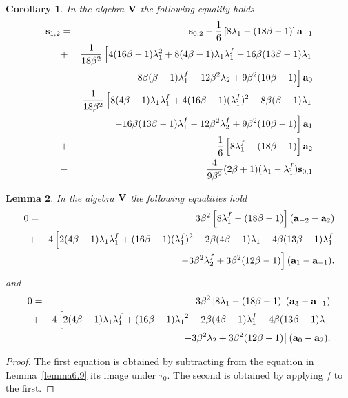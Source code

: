 \documentclass[a4paper]{amsart}
\newtheorem{lemma}{Lemma}[section]
\newtheorem{cor}[lemma]{Corollary}
\newcommand{\Vo}{{\bf V}}
\newcommand{\lmu}{\lambda_1}
\newcommand{\lmf}{\lambda_1^f}
\newcommand{\lmd}{\lambda_2}
\newcommand{\lmdf}{\lambda_2^f}
\newcommand{\bt}{\beta}
\newcommand{\ba}{{\bf a}}
\newcommand{\bs}{{\bf s}}
\begin{document}
\begin{cor}\label{eqs2f} %
In the algebra $\Vo$ the following equality holds
\begin{eqnarray*}
\bs_{1,2}&=&\bs_{0,2}-\frac{1}{6}\left[8\lmu-(18\bt-1)\right ]\ba_{-1}\\
&+&\frac{1}{18\bt^2}\left[4(16\bt-1)\lmu^2+8(4\bt-1)\lmu\lmf-16\bt(13\bt-1)\lmu \right . \nonumber \\
&& \left .-8\bt(\bt-1)\lmf-12\bt^2\lmd+9\bt^2(10\bt-1)\right ]\ba_0\nonumber \\
&-& \frac{1}{18\bt^2}\left [8(4\bt-1)\lmu\lmf+4(16\bt-1)(\lmf)^2-8\bt(\bt-1)\lmu \right . \nonumber \\
&& \left .-16\bt(13\bt-1)\lmf-12\bt^2\lmdf+9\bt^2(10\bt-1)\right ]\ba_1 \nonumber \\
&+&\frac{1}{6}\left [8\lmf-(18\bt-1)\right ]\ba_2 \nonumber \\
&-&\frac{4}{9\bt^2}(2\bt+1)(\lmu-\lmf)\bs_{0,1} \nonumber \\
\end{eqnarray*}
\end{cor}


\begin{lemma}\label{Rel} %
In the algebra $\Vo$ the following equalities hold
\begin{eqnarray}\label{eqs2}
0&=&3\bt^2\left [8\lmf-(18\bt-1)\right ](\ba_{-2} -\ba_2)\nonumber \\
&+&4\left[2(4\bt-1)\lmu\lmf+(16\bt-1)(\lmf)^2-2\bt(4\bt-1)\lmu-4\bt(13\bt-1)\lmf  \right . \nonumber \\
&& \left .-3\bt^2\lmdf+3\bt^2(12\bt-1)\right ](\ba_1-\ba_{-1}).\nonumber 
\end{eqnarray}
and 
\begin{eqnarray}\label{eqs3}
0&=&3\bt^2\left [8\lmu-(18\bt-1)\right ](\ba_{3} -\ba_{-1})\nonumber \\
&+&4\left[2(4\bt-1)\lmu\lmf+(16\bt-1){\lmu}^2-2\bt(4\bt-1)\lmf-4\bt(13\bt-1)\lmu  \right . \nonumber \\
&& \left .-3\bt^2\lmd+3\bt^2(12\bt-1)\right ](\ba_0-\ba_{2}).\nonumber 
\end{eqnarray}
\end{lemma}
\begin{proof}
The first equation is obtained by subtracting from the equation in Lemma~\ref{lemma6.9} its image under $\tau_0$. The second is obtained by applying $f$ to the first.
\end{proof}
\end{document}
